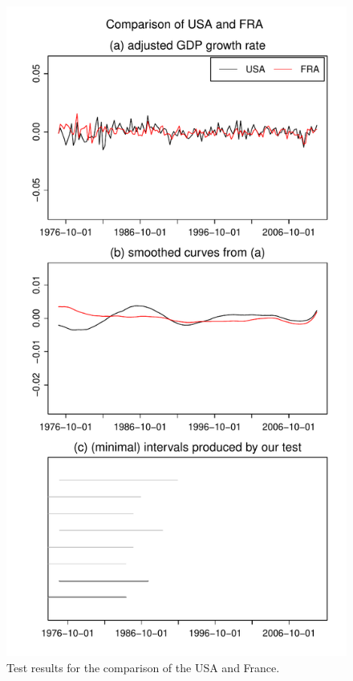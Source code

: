 \documentclass[12pt]{article}
\begin{document}
\begin{figure}
\hspace{0.1cm}
\begin{minipage}[t]{0.24\textwidth}
\includegraphics[width=\textwidth]{../output/plots/gdp/USA_vs_FRA}
\caption{Test results for the comparison of the USA and France.}\label{fig:USA:France}
\end{minipage}
\hspace{0.1cm}

\end{figure}
\end{document}
